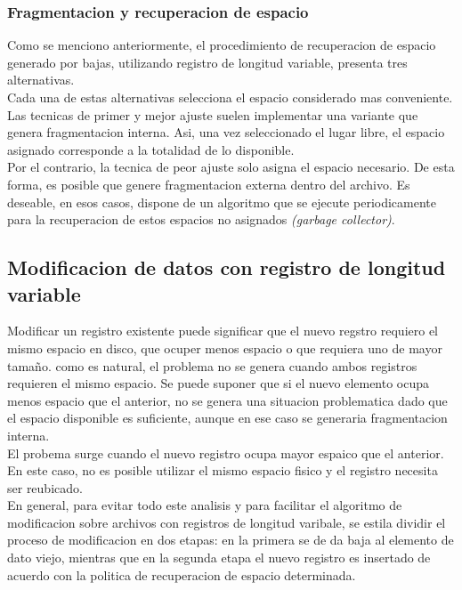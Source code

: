 \subsubsection{Fragmentacion y recuperacion de espacio}
Como se menciono anteriormente, el procedimiento de recuperacion de espacio generado por bajas, utilizando registro de longitud variable, presenta tres alternativas.\\
Cada una de estas alternativas selecciona el espacio considerado mas conveniente. Las tecnicas de primer y mejor ajuste suelen implementar una variante que genera fragmentacion interna. Asi, una vez seleccionado el lugar libre, el espacio asignado corresponde a la totalidad de lo disponible. \\
Por el contrario, la tecnica de peor ajuste solo asigna el espacio necesario. De esta forma, es posible que genere fragmentacion externa dentro del archivo. Es deseable, en esos casos, dispone de un algoritmo que se ejecute periodicamente para la recuperacion de estos espacios no asignados \textit{(garbage collector)}.

\subsection{Modificacion de datos con registro de longitud variable}
Modificar un registro existente puede significar que el nuevo regstro requiero el mismo espacio en disco, que ocuper menos espacio o que requiera uno de mayor tamaño. como es natural, el problema no se genera cuando ambos registros requieren el mismo espacio. Se puede suponer que si el nuevo elemento ocupa menos espacio que el anterior, no se genera una situacion problematica dado que el espacio disponible es suficiente, aunque en ese caso se generaria fragmentacion interna. \\
El probema surge cuando el nuevo registro ocupa mayor espaico que el anterior. En este caso, no es posible utilizar el mismo espacio fisico y el registro necesita ser reubicado. \\
En general, para evitar todo este analisis y para facilitar el algoritmo de modificacion sobre archivos con registros de longitud varibale, se estila dividir el proceso de modificacion en dos etapas: en la primera se de da baja al elemento de dato viejo, mientras que en la segunda etapa el nuevo registro es insertado de acuerdo con la politica de recuperacion de espacio determinada.

